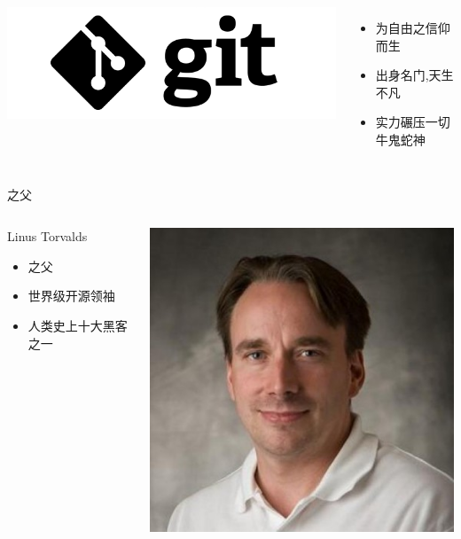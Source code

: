 \begin{frame}
    \begin{columns}[onlytextwidth]
        \centering
        \includegraphics[scale=0.24]{figures/git.png}\\
        \begin{itemize}
            \item 为自由之信仰而生
            \item 出身名门,天生不凡
            \item 实力碾压一切牛鬼蛇神
        \end{itemize}
    \end{columns}
\end{frame}

\begin{frame}[t]{之父}
    \begin{columns}[onlytextwidth]
        \begin{exampleblock}{Linus Torvalds}
            \begin{itemize}
                \item {}之父
                \item 世界级开源领袖
                \item 人类史上十大黑客之一
            \end{itemize}
        \end{exampleblock}
        \centering
        \includegraphics[height=28ex,width=24ex]{figures/linus.jpg}\\
    \end{columns}
\end{frame}

